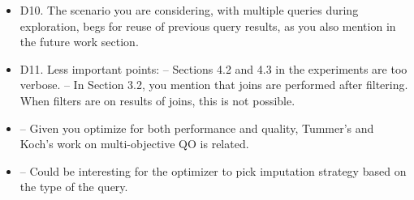 \documentclass{vldb}
\newcommand{\resp}[1]{{\color{blue}{#1}}}
\begin{document}
\begin{itemize}
\item D10. The scenario you are considering, with multiple queries during exploration, begs for reuse of previous query results, as you also mention in the future work section.

\item D11. Less important points:
-- Sections 4.2 and 4.3 in the experiments are too verbose.
-- In Section 3.2, you mention that joins are performed after filtering. When filters are on results of joins, this is not possible.

\item -- Given you optimize for both performance and quality, Tummer's and Koch's work on multi-objective QO is related.

  \resp{Yes, Tummer \& Koch is closely related. However, much of the complexity of their paper is in dealing with cost functions which are not well behaved. Our cost functions are both monotonic, which allows us to use a simpler optimizer than what Tummer \& Koch propose.}

\item -- Could be interesting for the optimizer to pick imputation strategy based on the type of the query.
\end{itemize}
\end{document}
